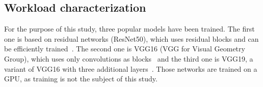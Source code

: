 \subsection{Workload characterization}
\label{offline:workload}

\begin{table}[t]
\caption{Workload characterization }
\centering
{}%
\label{table:herofake-tasks}
\end{table}

For the purpose of this study, three popular models have been trained. The first one is based on residual networks (ResNet50), which uses residual blocks and can be efficiently trained~\cite{NEURIPS2019_7716d0fc}. The second one is VGG16 (VGG for Visual Geometry Group), which uses only convolutions as blocks~\cite{DBLP:journals/corr/SimonyanZ14a} and the third one is VGG19, a variant of VGG16 with three additional layers~\cite{biom10070984}. Those networks are trained on a GPU, as training is not the subject of this study.

